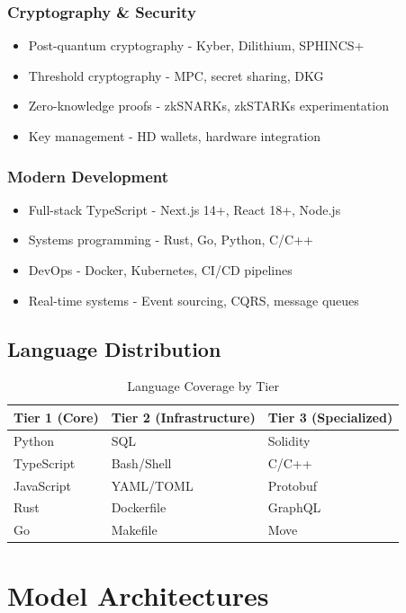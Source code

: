 \documentclass[11pt,a4paper]{article}
\begin{document}
\subsubsection{Cryptography \& Security}
\begin{itemize}
    \item Post-quantum cryptography - Kyber, Dilithium, SPHINCS+
    \item Threshold cryptography - MPC, secret sharing, DKG
    \item Zero-knowledge proofs - zkSNARKs, zkSTARKs experimentation
    \item Key management - HD wallets, hardware integration
\end{itemize}

\subsubsection{Modern Development}
\begin{itemize}
    \item Full-stack TypeScript - Next.js 14+, React 18+, Node.js
    \item Systems programming - Rust, Go, Python, C/C++
    \item DevOps - Docker, Kubernetes, CI/CD pipelines
    \item Real-time systems - Event sourcing, CQRS, message queues
\end{itemize}

\subsection{Language Distribution}

\begin{table}[H]
\centering
\begin{tabular}{lll}
\toprule
\textbf{Tier 1 (Core)} & \textbf{Tier 2 (Infrastructure)} & \textbf{Tier 3 (Specialized)} \\
\midrule
Python & SQL & Solidity \\
TypeScript & Bash/Shell & C/C++ \\
JavaScript & YAML/TOML & Protobuf \\
Rust & Dockerfile & GraphQL \\
Go & Makefile & Move \\
\bottomrule
\end{tabular}
\caption{Language Coverage by Tier}
\end{table}

\section{Model Architectures}
\end{document}
